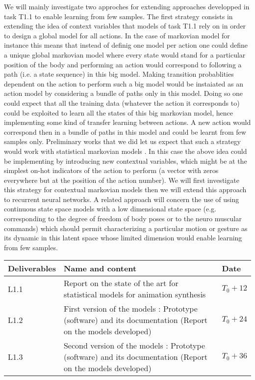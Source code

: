 We will mainly investigate two approches for extending approaches developped in task T1.1 to enable learning from few samples. The first strategy consists in extending the idea of context variables that models of task T1.1 rely on in order to design a global model for all actions.
In the case of markovian model for instance this means that instead of definig one model per action one could define a unique global markovian model where every state would stand for a particular position of the body and performing an action would correspond to following a path (i.e. a state sequence) in this big model. 
Making transition probablities dependent on the action to perform such a big model would be instaiated as an action model by considering a bundle of paths only in this model.  Doing so one could expect that all the training data (whatever the action it corresponds to) could be exploited to learn all the states of this big markovian model, hence implementing some kind of transfer learning between actions. 
A new action would correspond then in a bundle of paths in this model and could be learnt from few samples only. Preliminary works that we did let us expect that such a strategy would work with statistical markovian models \cite{DBLP:conf/icassp/DingRAP13, Radenen2014}. In this case the above idea could be implementing by introducing new contextual variables, which might be at the simplest on-hot indicators of the action to perform (a vector with zeros everywhere but at the position of the action number). We will first investigate this strategy for contextual markovian models then we will extend this approach to recurrent neural networks.
A related approach will concern the use of using continuous state space models with a low dimensional state space (e.g. corresponding to the degree of freedom of body poses or to the neuro muscular commands) which should permit characterizing a particular motion or gesture as its dynamic in this latent space whose limited dimension would enable learning from few samples.


\begin{tabular}{|p{3cm}|p{10cm}|p{1.5cm}|}\hline
Deliverables & Name and content  & Date  \\\hline
L1.1  & Report on the state of the art for statistical models for animation synthesis &  $T_0+12$ \\\hline
L1.2  & First version of the models : Prototype (software) and its documentation (Report on the models developed) & $T_0+24$ \\\hline
L1.3  & Second version of the models : Prototype (software) and its documentation (Report on the models developed)  & $T_0+36$ \\\hline
\end{tabular}

